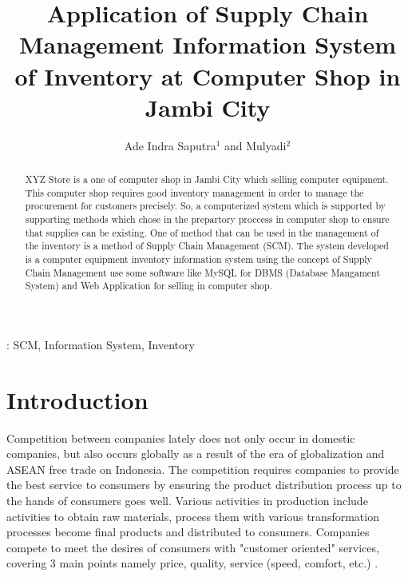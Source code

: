 \documentclass[12pt,a4paper,final]{iopart}
\begin{document}
\title[Preparing an article for INCITEST 2020]{Application of Supply Chain Management Information System of Inventory at Computer Shop in Jambi City}

\author{Ade Indra Saputra$^{1}$ and Mulyadi$^{2}$}
\address{$^1$Magister Sistem Informasi, Universitas Komputer Indonesia}
\address{$^2$Sistem Informasi, STIKOM DB Jambi}




\begin{abstract}
XYZ Store is a one of computer shop in Jambi City which selling computer equipment. This computer shop requires good inventory management in order to manage the procurement for customers precisely. So, a computerized system which is supported by supporting methods which chose in the prepartory proccess in computer shop to ensure that supplies can be existing. One of method that can be used in the management of the inventory is a method of Supply Chain Management (SCM). The system developed is a computer equipment inventory information system using the concept of Supply Chain Management use some software like MySQL for DBMS (Database Mangament System) and Web Application for selling in computer shop.

\end{abstract}

\vspace{2pc}
: SCM, Information System, Inventory

\section{Introduction}

Competition between companies lately does not only occur in domestic companies, but also occurs globally as a result of the era of globalization and ASEAN free trade on Indonesia. The competition requires companies to provide the best service to consumers by ensuring the product distribution process up to the hands of consumers goes well. Various activities in production include activities to obtain raw materials, process them with various transformation processes become final products and distributed to consumers. Companies compete to meet the desires of consumers with "customer oriented" services, covering 3 main points namely price, quality, service (speed, comfort, etc.) \cite{Indrajit2016a}.
\end{document}
